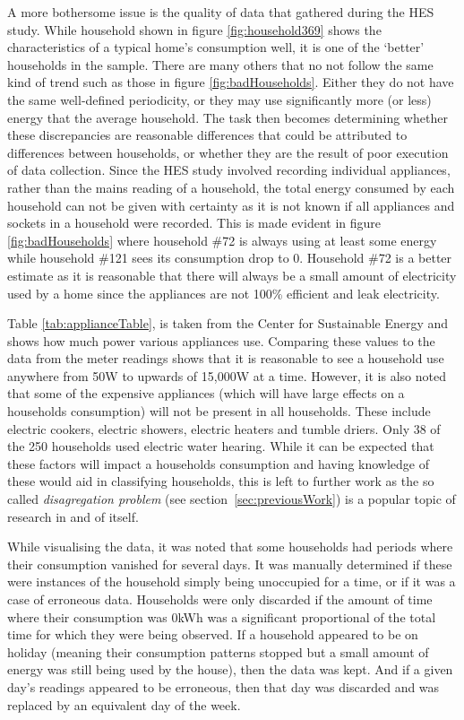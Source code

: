 A more bothersome issue is the quality of data that gathered during the HES study. While household shown in figure \ref{fig:household369} shows the characteristics of a typical home's consumption well, it is one of the `better' households in the sample. There are many others that no not follow the same kind of trend such as those in figure \ref{fig:badHouseholds}. Either they do not have the same well-defined periodicity, or they may use significantly more (or less) energy that the average household. The task then becomes determining whether these discrepancies are reasonable differences that could be attributed to differences between households, or whether they are the result of poor execution of data collection. Since the HES study involved recording individual appliances, rather than the mains reading of a household, the total energy consumed by each household can not be given with certainty as it is not known if all appliances and sockets in a household were recorded. This is made evident in figure \ref{fig:badHouseholds} where household \#72 is always using at least some energy while household \#121 sees its consumption drop to 0. Household \#72 is a better estimate as it is reasonable that there will always be a small amount of electricity used by a home since the appliances are not 100\% efficient and leak electricity.

\badHouseholds

Table \ref{tab:applianceTable}, is taken from the Center for Sustainable Energy \cite{CSE} and shows how much power various appliances use. Comparing these values to the data from the meter readings shows that it is reasonable to see a household use  anywhere from 50W to upwards of 15,000W at a time. However, it is also noted that some of the expensive appliances (which will have large effects on a households consumption) will not be present in all households. These include electric cookers, electric showers, electric heaters and tumble driers. Only 38 of the 250 households used electric water hearing. While it can be expected that these factors will impact a households consumption and having knowledge of these would aid in classifying households, this is left to further work as the so called \textit{disagregation problem} (see section~\ref{sec:previousWork}) is a popular topic of research in and of itself.

\applianceTable


While visualising the data, it was noted that some households had periods where their consumption vanished for several days. It was manually determined if these were instances of the household simply being unoccupied for a time, or if it was a case of erroneous data. Households were only discarded if the amount of time where their consumption was 0kWh was a significant proportional of the total time for which they were being observed. If a household appeared to be on holiday (meaning their consumption patterns stopped but a small amount of energy was still being used by the house), then the data was kept. And if a given day's readings appeared to be erroneous, then that day was discarded and was replaced by an equivalent day of the week.

